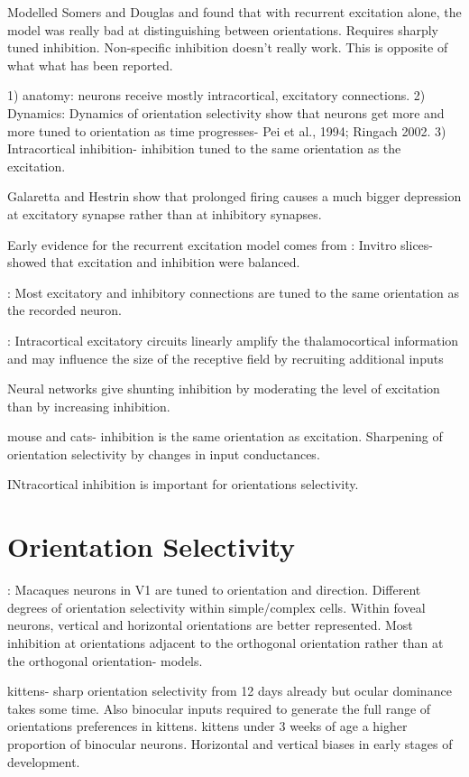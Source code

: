 \cite{Carandini1997} Modelled Somers and Douglas and found that with recurrent excitation alone, the model was really bad at distinguishing between orientations. Requires sharply tuned inhibition. Non-specific inhibition doesn't really work. This is opposite of what what has been reported. 


1) anatomy: neurons receive mostly intracortical, excitatory connections. 
2) Dynamics: Dynamics of orientation selectivity show that neurons get more and more tuned to orientation as time progresses- Pei et al., 1994; Ringach 2002. 
3) Intracortical inhibition- inhibition tuned to the same orientation as the excitation.

\cite{Nelson1998} Galaretta and Hestrin show that prolonged firing causes a much bigger depression at excitatory synapse rather than at inhibitory synapses.

Early evidence for the recurrent excitation model comes from 
\cite{Shu2003}: Invitro slices- showed that excitation and inhibition were balanced. 

\cite{Monier2003}: Most excitatory and inhibitory connections are tuned to the same orientation as the recorded neuron.

\cite{Li2013}: Intracortical excitatory circuits linearly amplify the thalamocortical information and may influence the size of the receptive field by recruiting additional inputs

\cite{Sato2016} Neural networks give shunting inhibition by moderating the level of excitation than by increasing inhibition.

\cite{Tan2011a} mouse and cats- inhibition is the same orientation as excitation. Sharpening of orientation selectivity by changes in input conductances.

\cite{Shapley2007} INtracortical inhibition is important for orientations selectivity.
\section{Orientation Selectivity}
\cite{DeValois1982}: Macaques neurons in V1 are tuned to orientation and direction. Different degrees of orientation selectivity within simple/complex cells. Within foveal neurons, vertical and horizontal orientations are better represented. Most inhibition at orientations adjacent to the orthogonal orientation rather than at the orthogonal orientation- models.

\cite{Fregnac1978} kittens- sharp orientation selectivity from 12 days already but ocular dominance takes some time. Also binocular inputs required to generate the full range of orientations preferences in kittens. kittens under 3 weeks of age a higher proportion of binocular neurons. Horizontal and vertical biases in early stages of development.

